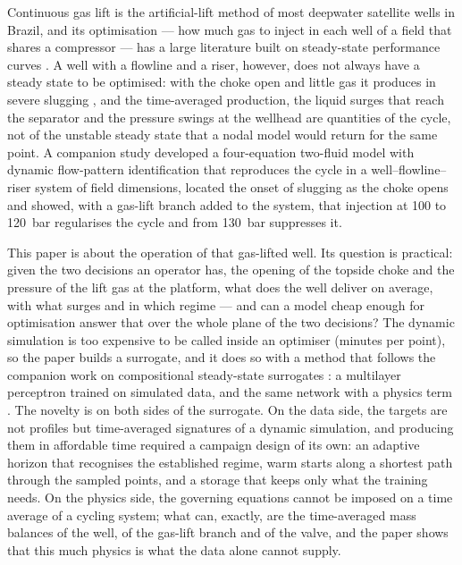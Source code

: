 \documentclass[a4paper,fleqn]{cas-sc}
\begin{document}
Continuous gas lift is the artificial-lift method of most deepwater satellite wells in Brazil, and its optimisation --- how much gas to inject in each well of a field that shares a compressor --- has a large literature built on steady-state performance curves \citep{souza2010}. A well with a flowline and a riser, however, does not always have a steady state to be optimised: with the choke open and little gas it produces in severe slugging \citep{schmidt1980,taitel1986,jansen1996}, and the time-averaged production, the liquid surges that reach the separator and the pressure swings at the wellhead are quantities of the cycle, not of the unstable steady state that a nodal model would return for the same point. A companion study \citep{souza2026a} developed a four-equation two-fluid model with dynamic flow-pattern identification that reproduces the cycle in a well--flowline--riser system of field dimensions, located the onset of slugging as the choke opens and showed, with a gas-lift branch added to the system, that injection at 100 to \SI{120}{\bar} regularises the cycle and from \SI{130}{\bar} suppresses it.

This paper is about the operation of that gas-lifted well. Its question is practical: given the two decisions an operator has, the opening of the topside choke and the pressure of the lift gas at the platform, what does the well deliver on average, with what surges and in which regime --- and can a model cheap enough for optimisation answer that over the whole plane of the two decisions? The dynamic simulation is too expensive to be called inside an optimiser (minutes per point), so the paper builds a surrogate, and it does so with a method that follows the companion work on compositional steady-state surrogates \citep{carvalho2026b}: a multilayer perceptron trained on simulated data, and the same network with a physics term \citep{raissi2019,karniadakis2021}. The novelty is on both sides of the surrogate. On the data side, the targets are not profiles but time-averaged signatures of a dynamic simulation, and producing them in affordable time required a campaign design of its own: an adaptive horizon that recognises the established regime, warm starts along a shortest path through the sampled points, and a storage that keeps only what the training needs. On the physics side, the governing equations cannot be imposed on a time average of a cycling system; what can, exactly, are the time-averaged mass balances of the well, of the gas-lift branch and of the valve, and the paper shows that this much physics is what the data alone cannot supply.
\end{document}
